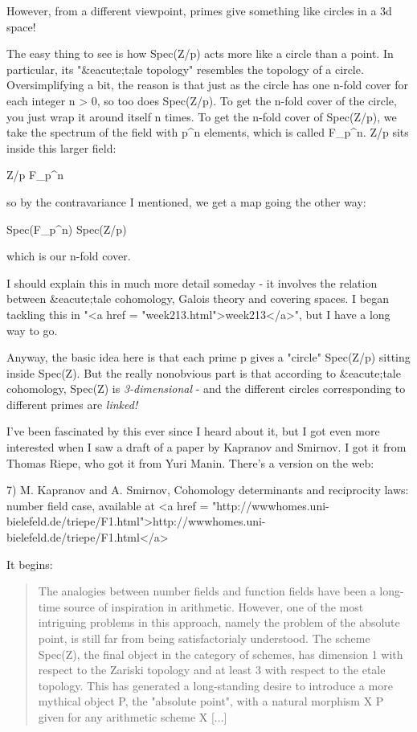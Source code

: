 However, from a different viewpoint, primes give something like
circles in a 3d space!

The easy thing to see is how Spec(Z/p) acts more like a circle than a point.
In particular, its "&eacute;tale topology" resembles the topology of a
circle.  Oversimplifying a bit, the reason is that just as the circle
has one n-fold cover for each integer n > 0, so too does Spec(Z/p).
To get the n-fold cover of the circle, you just wrap it around itself
n times.  To get the n-fold cover of Spec(Z/p), we take the spectrum
of the field with p^{n} elements, which is called
F_{p^{n}}.  Z/p sits inside this larger field:

Z/p \to  F_{p^{n}}

so by the contravariance I mentioned, we get a map going the
other way:

Spec(F_{p^{n}}) \to  Spec(Z/p)

which is our n-fold cover.

I should explain this in much more detail someday - it involves
the relation between &eacute;tale cohomology, Galois theory and
covering spaces.  I began tackling this in 
"<a href = "week213.html">week213</a>", but I have a long
way to go.

Anyway, the basic idea here is that each prime p gives a "circle" 
Spec(Z/p) sitting inside Spec(Z).  
But the really nonobvious part is that according to &eacute;tale
cohomology, Spec(Z) is \emph{3-dimensional} - and the different circles
corresponding to different primes are \emph{linked!}

I've been fascinated by this ever since I heard about it, but I
got even more interested when I saw a draft of a paper by 
Kapranov and Smirnov.  I got it from Thomas Riepe, who got
it from Yuri Manin.  There's a version on the web:

7) M. Kapranov and A. Smirnov, Cohomology determinants and
reciprocity laws: number field case, available at
<a href = "http://wwwhomes.uni-bielefeld.de/triepe/F1.html">http://wwwhomes.uni-bielefeld.de/triepe/F1.html</a>

It begins:

\begin{quote}
     The analogies between number fields and function fields
     have been a long-time source of inspiration in arithmetic.
     However, one of the most intriguing problems in this
     approach, namely the problem of the absolute point, is
     still far from being satisfactorialy understood.  The
     scheme Spec(Z), the final object in the category of schemes,
     has dimension 1 with respect to the Zariski topology
     and at least 3 with respect to the etale topology.  This
     has generated a long-standing desire to introduce a more
     mythical object P, the "absolute point", with a natural
     morphism X \to  P given for any arithmetic scheme X [...]
\end{quote}


